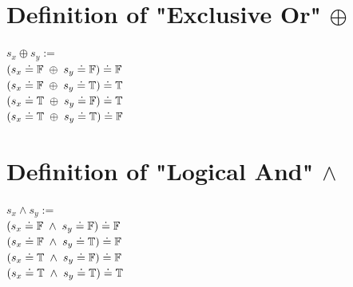 \documentclass[11pt]{article}
\begin{document}
\section{Definition of "Exclusive Or" $\oplus$}
\begin{center}
$
s_x \oplus s_y :=
$
\\ \vspace{3mm}
$
(s_x \doteq \mathbb{F} \hspace{1mm} \oplus \hspace{1mm} s_y\doteq \mathbb{F}) \doteq \mathbb{F}
$
\\ \vspace{3mm}
$
(s_x \doteq \mathbb{F} \hspace{1mm} \oplus \hspace{1mm} s_y\doteq \mathbb{T}) \doteq \mathbb{T}
$
\\ \vspace{3mm}
$
(s_x \doteq \mathbb{T} \hspace{1mm} \oplus \hspace{1mm} s_y\doteq \mathbb{F}) \doteq \mathbb{T}
$
\\ \vspace{3mm}
$
(s_x \doteq \mathbb{T} \hspace{1mm} \oplus \hspace{1mm} s_y\doteq \mathbb{T}) \doteq \mathbb{F}
$
\end{center}


\section{Definition of "Logical And" $\land$}
\begin{center}
$
s_x \land s_y :=
$
\\ \vspace{3mm}
$
(s_x \doteq \mathbb{F} \hspace{1mm} \land \hspace{1mm} s_y\doteq \mathbb{F}) \doteq \mathbb{F}
$
\\ \vspace{3mm}
$
(s_x \doteq \mathbb{F} \hspace{1mm} \land \hspace{1mm} s_y\doteq \mathbb{T}) \doteq \mathbb{F}
$
\\ \vspace{3mm}
$
(s_x \doteq \mathbb{T} \hspace{1mm} \land \hspace{1mm} s_y\doteq \mathbb{F}) \doteq \mathbb{F}
$
\\ \vspace{3mm}
$
(s_x \doteq \mathbb{T} \hspace{1mm} \land \hspace{1mm} s_y\doteq \mathbb{T}) \doteq \mathbb{T}
$
\end{center}
\end{document}
